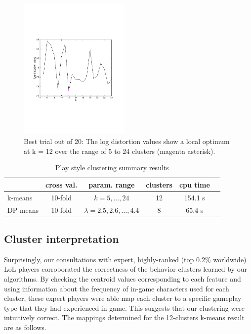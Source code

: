 \documentclass[letterpaper,10 pt,conference]{ieeeconf}
\begin{document}
\begin{figure}[htbp!]
  \centering
  \includegraphics[trim=55pt 200pt 70pt 200pt, clip, width=0.48\textwidth]{km-conv.pdf}
  \caption{Best trial out of 20: The log distortion values show a local optimum at k = 12 over the range of 5 to 24 clusters (magenta asterisk).}
  \label{fig:kmeans-conv}
\end{figure}

\begin{table}[htbp!]
  \centering
  \caption{Play style clustering summary results}
  \begin{tabular}{lccccc}
    \toprule
    & cross val. & param. range & clusters & cpu time \\ \midrule
    k-means & 10-fold & $k = 5, \ldots, 24$ & 12 & 154.1 s \\
    DP-means & 10-fold & $\lambda = 2.5,2.6,\ldots,4.4$ & 8 & 65.4 s \\
    \bottomrule
  \end{tabular}
  \label{tab:clus}
\end{table}

\subsection{Cluster interpretation}

Surprisingly, our consultations with expert, highly-ranked (top 0.2\% worldwide) LoL players corroborated the correctness of the behavior clusters learned by our algorithms. By checking the centroid values corresponding to each feature and using information about the frequency of in-game characters used for each cluster, these expert players were able map each cluster to a specific gameplay type that they had experienced in-game. This suggests that our clustering were intuitively correct. The mappings determined for the 12-clusters k-means result are as follows. 
\end{document}
